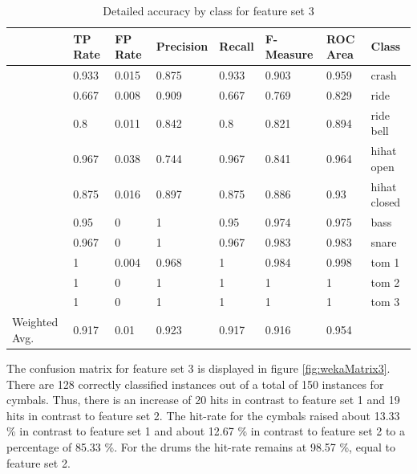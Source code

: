 \begin{table}
  \caption{Detailed accuracy by class for feature set 3}
  \label{tab:wekaAcc3} 
	\centering
	\footnotesize
	\begin{tabular}[c]{|l|l|l|l|l|l|l|l|}
	  \hline		  
         &      TP Rate &  FP Rate &  Precision  & Recall &  F-Measure  & ROC Area  &Class \\
	  \hline
          &       0.933  &   0.015   &   0.875  &   0.933   &  0.903   &   0.959   & crash \\
	  \hline
        &         0.667  &   0.008   &   0.909  &   0.667   &  0.769  &    0.829  &  ride \\
	  \hline
        &         0.8   &    0.011   &   0.842   &  0.8   &    0.821   &   0.894 &   ride bell \\
	  \hline
         &        0.967  &   0.038    &  0.744   &  0.967  &   0.841   &   0.964   & hihat open \\
	  \hline
          &       0.875  &   0.016   &   0.897    & 0.875  &   0.886   &   0.93    & hihat closed \\
	  \hline
       &          0.95   &   0      &    1     &    0.95   &   0.974    &  0.975 &   bass \\
	  \hline
        &         0.967   &  0    &      1    &     0.967   &  0.983   &   0.983  &  snare \\
	  \hline
       &          1    &     0.004    &  0.968  &   1     &    0.984  &    0.998  &  tom 1 \\
	  \hline
         &        1     &    0      &    1      &   1 &       1      &    1      &  tom 2 \\
	  \hline
        &         1    &     0   &       1    &     1   &      1    &      1    &    tom 3 \\
	  \hline
Weighted Avg.  &  0.917   &  0.01   &    0.923  &   0.917   &  0.916     & 0.954 & \\
	  \hline
	\end{tabular}
\end{table}

The confusion matrix for feature set 3 is displayed in figure \ref{fig:wekaMatrix3}. There are 128 correctly classified instances out of a total of 150 instances for cymbals. Thus, there is an increase of 20 hits in contrast to feature set 1 and 19 hits in contrast to feature set 2. The hit-rate for the cymbals raised about 13.33 \% in contrast to feature set 1 and about 12.67 \% in contrast to feature set 2 to a percentage of 85.33 \%. For the drums the hit-rate remains at 98.57 \%, equal to feature set 2. 

